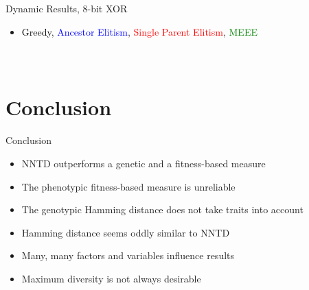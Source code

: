 \begin{frame}[t]{Dynamic Results, 8-bit XOR}
  \begin{itemize}
    \item \textcolor{black}{Greedy}, \textcolor{blue}{Ancestor Elitism}, \textcolor{red}{Single Parent Elitism}, \textcolor{green}{MEEE}
  \end{itemize}

  \begin{columns}[T]
    \begin{figure}
      \centering
      \batchmode
      \scrollmode
    \end{figure}
    \vfill
    \begin{figure}
      \centering
      \batchmode
      \scrollmode
    \end{figure}
    \begin{figure}
      \centering
      \batchmode
      \scrollmode
    \end{figure}
    \begin{figure}
      \centering
      \batchmode
      \scrollmode
    \end{figure}
  \end{columns}

\end{frame}

\section{Conclusion}
\begin{frame}{Conclusion}
  \begin{itemize}
    \item NNTD outperforms a genetic and a fitness-based measure
    \item The phenotypic fitness-based measure is unreliable
    \item The genotypic Hamming distance does not take traits into account
    \item Hamming distance seems oddly similar to NNTD
    \item Many, many factors and variables influence results
    \item Maximum diversity is not always desirable
  \end{itemize}
\end{frame}

